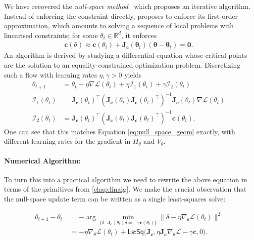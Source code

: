 We have recovered the \emph{null-space method}~\citep{yamashita1980differential} which proposes an iterative algorithm. Instead of enforcing the constraint directly, \citet{yamashita1980differential} proposes to enforce its first-order approximation, which amounts to solving a sequence of local problems with linearised constraints; for some $\theta_t \in \mathbb{R}^d$, it enforces
\begin{align}
\mathbf{c}(\theta) \approx \mathbf{c}(\theta_t) + \mathbf{J}_\mathbf{c}(\mathbf{\theta}_t)(\mathbf{\theta} - \mathbf{\theta}_t) = \mathbf{0}.
\end{align} 
An algorithm is derived by studying a differential equation whose critical points are the solution to an equality-constrained optimization problem. Discretizing such a flow with learning rates $\eta, \gamma > 0$ yields
\begin{subequations}
\begin{align}
\theta_{t+1} &=  \theta_t -\eta \nabla\mathcal{L}(\theta_{t})  + \eta \mathcal{I}_1(\theta_t)+ \gamma\mathcal{I}_2(\theta_t) \\ 
\mathcal{I}_1(\theta_t) &= \mathbf{J_{c}}(\theta_t)^{\top}(\mathbf{J_{c}}(\theta_t) \mathbf{J_{c}}(\theta_t)^{\top})^{-1}\mathbf{J_{c}}(\theta_t) \nabla\mathcal{L}(\theta_{t}) 
\\ 
\mathcal{I}_2(\theta_t) &= \mathbf{J_{c}}(\theta_t)^{\top}(\mathbf{J_{c}}(\theta_t)\mathbf{J_{c}}(\theta_t)^{\top})^{-1}\mathbf{c}(\theta_{t}).
\end{align}
\end{subequations}
One can see that this matches Equation \ref{eq:null_space_geom} exactly, with different learning rates for the gradient in $H_\theta$ and $V_\theta$. 

\paragraph{Numerical Algorithm:}
To turn this into a practical algorithm we need to rewrite the above equation in terms of the primitives from \cref{chap:linalg}. We make the crucial observation that the null-space update term can be written as a single least-squares solve:

\begin{subequations}
\label{eq:local_least_squares}
\begin{align} 
\theta_{t+1} - \theta_t  
&~= -\arg \min_{\{\delta:~ \mathbf{J_{c}}(\theta_t)\delta=-\gamma\mathbf{c}(\theta_{t}) \}} \|\delta - \eta\nabla_{\theta}\mathcal{L}(\theta_t)\|^{2} 
 \label{eq:linearized-constraint}\\
&~= -\eta \nabla_{\theta}\mathcal{L}(\theta_t) 
    + \textsf{LstSq}\big(\mathbf{J}_\mathbf{c}, \eta\mathbf{J_c}\nabla_{\theta}\mathcal{L} - \gamma\mathbf{c}, 0\big).
\label{equation-affine-trafo-gradient}
\end{align}
\end{subequations}

